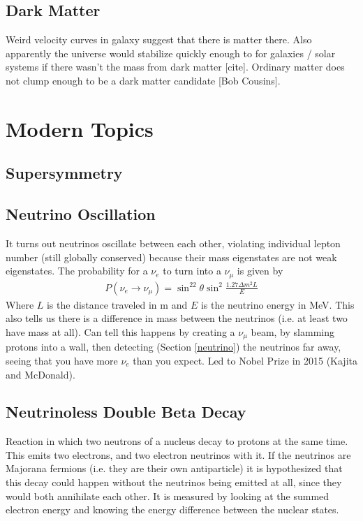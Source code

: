 \subsection{Dark Matter}
Weird velocity curves in galaxy suggest that there is matter there. Also apparently the universe would stabilize quickly enough to for galaxies / solar systems if there wasn't the mass from dark matter [cite]. Ordinary matter does not clump enough to be a dark matter candidate [Bob Cousins].
\section{Modern Topics}
\subsection{Supersymmetry}

\subsection{Neutrino Oscillation}
It turns out neutrinos oscillate between each other, violating individual lepton number (still globally conserved) because their mass eigenstates are not weak eigenstates. The probability for a $\nu_e$ to turn into a $\nu_\mu$ is given by
\begin{align}
P(\nu_e\rightarrow\nu_\mu) = \sin^22\theta\sin^2\frac{1.27\Delta m^2L}{E}
\end{align}
Where $L$ is the distance traveled in m and $E$ is the neutrino energy in MeV. This also tells us there is a difference in mass between the neutrinos (i.e. at least two have mass at all). Can tell this happens by creating a $\nu_\mu$ beam, by slamming protons into a wall, then detecting (Section \ref{neutrino}) the neutrinos far away, seeing that you have more $\nu_e$ than you expect. Led to Nobel Prize in 2015 (Kajita and McDonald). 

\subsection{Neutrinoless Double Beta Decay}
Reaction in which two neutrons of a nucleus decay to protons at the same time. This emits two electrons, and two electron neutrinos with it. If the neutrinos are Majorana fermions (i.e. they are their own antiparticle) it is hypothesized that this decay could happen without the neutrinos being emitted at all, since they would both annihilate each other. It is measured by looking at the summed electron energy and knowing the energy difference between the nuclear states.


